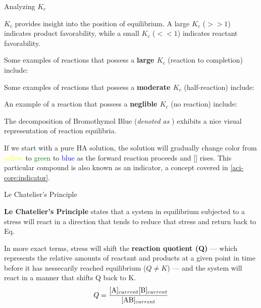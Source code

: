 \documentclass[10pt]{article}
\begin{document}
  \begin{core}{Analyzing $K_c$}
    
    $K_c$ provides insight into the position of equilibrium. A large $K_c$ ($>>1$) indicates product favorability, while a small $K_c$ ($<<1$) indicates reactant favorability.

    Some examples of reactions that possess a \textbf{large $K_c$} (reaction to completion) include:



    Some examples of reactions that possess a \textbf{moderate $K_c$} (half-reaction) include:




    An example of a reaction that possess a \textbf{neglible $K_c$} (no reaction) include:


  \end{core}

  The decomposition of Bromothymol Blue (\textit{denoted as }) exhibits a nice visual representation of reaction equilibria.
 

  If we start with a pure HA solution, the solution will gradually change color from \textcolor{Yellow}{yellow} to \textcolor{Green}{green} to \textcolor{Blue}{blue} as the forward reaction proceeds and [] rises. This particular compound is also known as an indicator, a concept covered in \autoref{aci-core:indicator}.
  
  \begin{core}[label=placeholder3]{Le Chatelier's Principle}

    \textbf{Le Chatelier's Principle} states that a system in equilibrium subjected to a stress will react in a direction that tends to reduce that stress and return back to Eq.

    In more exact terms, stress will shift the \textbf{reaction quotient (Q)} --- which represents the relative amounts of reactant and products at a given point in time before it has nessecarily reached equilibrium ($Q \neq K$) --- and the system will react in a manner that shifts Q back to K.
    \[
      Q = \frac{[\ce{A}]_{current}[\ce{B}]_{current}}{[\ce{AB}]_{current}}
    \] 

  \end{core}
\end{document}
